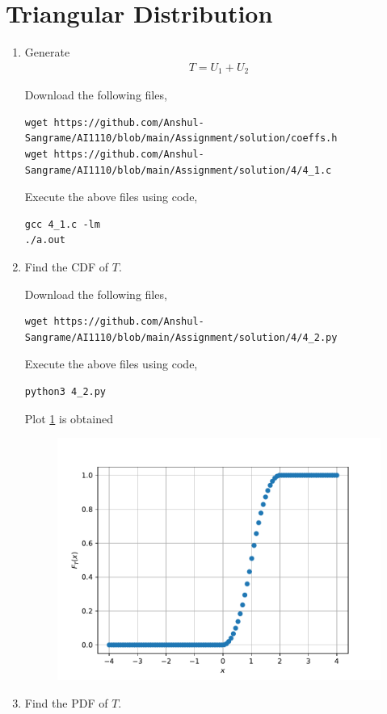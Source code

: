 \documentclass[journal,12pt,twocolumn]{IEEEtran}
\renewcommand\thesection{\arabic{section}}
\begin{document}
\section{Triangular Distribution}
\begin{enumerate}[label=\thesection.\arabic*
,ref=\thesection.\theenumi]
\item Generate
	\begin{align}
		T = U_1 + U_2
	\end{align}
	
\solution

Download the following files,
\begin{lstlisting}
wget https://github.com/Anshul-Sangrame/AI1110/blob/main/Assignment/solution/coeffs.h
wget https://github.com/Anshul-Sangrame/AI1110/blob/main/Assignment/solution/4/4_1.c
\end{lstlisting}
Execute the above files using code,
\begin{lstlisting}
gcc 4_1.c -lm
./a.out
\end{lstlisting}
%
\item Find the CDF of $T$.

\solution

Download the following files,
\begin{lstlisting}
wget https://github.com/Anshul-Sangrame/AI1110/blob/main/Assignment/solution/4/4_2.py
\end{lstlisting}
Execute the above files using code,
\begin{lstlisting}
python3 4_2.py
\end{lstlisting}
Plot \ref{fig:4.2} is obtained
\begin{figure}[!ht]
    \centering
    \includegraphics[width=\columnwidth]{../figs/tri_cdf_empirical.pdf}
    \caption{}
    \label{fig:4.2}
\end{figure}
%
\item Find the PDF of $T$.


\end{enumerate}
\end{document}

